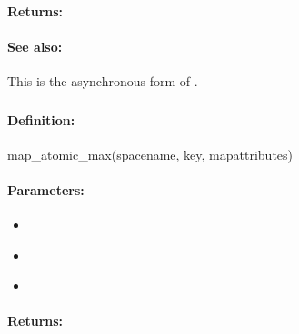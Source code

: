 \paragraph{Returns:}


\paragraph{See also:}  This is the asynchronous form of .

\pagebreak
\subsubsection{}
\label{api:ruby:map_atomic_max}


\paragraph{Definition:}
\begin{rubycode}
map_atomic_max(spacename, key, mapattributes)
\end{rubycode}

\paragraph{Parameters:}
\begin{itemize}[noitemsep]
\item {}\\

\item {}\\

\item {}\\

\end{itemize}

\paragraph{Returns:}


\pagebreak
\subsubsection{}
\label{api:ruby:async_map_atomic_max}


